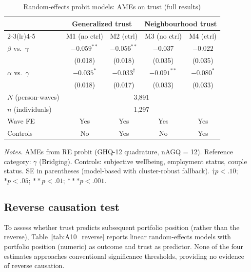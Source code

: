 \documentclass[12pt, a4paper]{article}
\newcommand{\tablenote}[1]{\vspace{4pt}\par\footnotesize\textit{Notes.} #1}
\begin{document}
\begin{table}[H]
\centering
\caption{Random-effects probit models: AMEs on trust (full results)}
\label{tab:A9_reprobit}
\small
\begin{tabular}{lcccc}
\hline\hline
  & \multicolumn{2}{c}{Generalized trust} & \multicolumn{2}{c}{Neighbourhood trust} \\
  \cmidrule(lr){2-3}\cmidrule(lr){4-5}
  & M1 (no ctrl) & M2 (ctrl) & M3 (no ctrl) & M4 (ctrl) \\
\hline
  $\beta$ vs.\ $\gamma$ & $-0.059^{**}$ & $-0.056^{**}$ & $-0.037$       & $-0.022$      \\
                        & (0.018)       & (0.018)       & (0.035)        & (0.035)       \\[4pt]
  $\alpha$ vs.\ $\gamma$& $-0.035^{*}$  & $-0.033^{\dagger}$ & $-0.091^{**}$ & $-0.080^{*}$ \\
                        & (0.018)       & (0.017)       & (0.033)        & (0.033)       \\
\hline
  $N$ (person-waves)    & \multicolumn{4}{c}{3,891} \\
  $n$ (individuals)     & \multicolumn{4}{c}{1,297} \\
  Wave FE               & Yes & Yes & Yes & Yes \\
  Controls              & No  & Yes & No  & Yes \\
\hline\hline
\end{tabular}
\tablenote{AMEs from RE probit (GHQ-12 quadrature, nAGQ = 12).
Reference category: $\gamma$ (Bridging). Controls: subjective wellbeing,
employment status, couple status.
SE in parentheses (model-based with cluster-robust fallback).
$\dagger p<.10$; $* p<.05$; $** p<.01$; $*** p<.001$.}
\end{table}

\subsection{Reverse causation test}

To assess whether trust predicts subsequent portfolio position (rather than
the reverse), Table~\ref{tab:A10_reverse} reports linear random-effects
models with portfolio position (numeric) as outcome and trust as predictor.
None of the four estimates approaches conventional significance thresholds,
providing no evidence of reverse causation.
\end{document}
